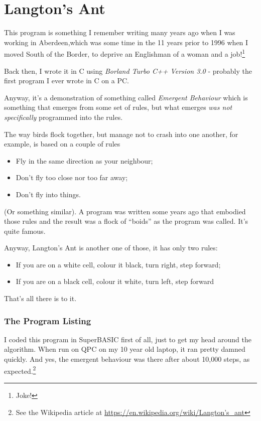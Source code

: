 \chapter{Langton's Ant}\label{chp-langtons-ant}

This program is something I remember writing many years ago when I was working in Aberdeen,which was some time in the 11 years prior to 1996 when I moved South of the Border, to deprive an Englishman of a woman and a job!\footnote{Joke!}

Back then, I wrote it in C using \emph{Borland Turbo C++ Version 3.0} - probably the first program I ever wrote in C on a PC.

Anyway, it's a demonstration of something called \emph{Emergent Behaviour} which is something that emerges from some set of rules, but what emerges \emph{was not specifically} programmed into the rules.

The way birds flock together, but manage not to crash into one another, for example, is based on a couple of rules

\begin{itemize}
	\item Fly in the same direction as your neighbour;
	\item Don't fly too close nor too far away;
	\item Don't fly into things.
\end{itemize}

(Or something similar). A program was written some years ago that embodied those rules and the result was a flock of ``boids'' as the program was called. It's quite famous.

Anyway, Langton's Ant is another one of those, it has only two rules:

\begin{itemize}
	\item If you are on a white cell, colour it black, turn right, step forward;
	\item If you are on a black cell, colour it white, turn left, step forward
\end{itemize}

That's all there is to it.

\subsection{The Program Listing}

I coded this program in SuperBASIC first of all, just to get my head around the algorithm. When run on QPC on my 10 year old laptop, it ran pretty damned quickly. And yes, the emergent behaviour was there after about 10,000 steps, as expected.\footnote{See the Wikipedia article at \href{https://en.wikipedia.org/wiki/Langton's\_ant}{https://en.wikipedia.org/wiki/Langton's\_ant}}

